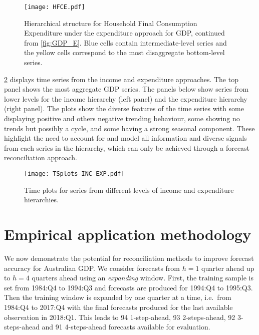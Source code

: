 {\begin{figure}[!t]
	\centering
	\texttt{[image: HFCE.pdf]}
	\caption{Hierarchical structure for Household Final Consumption Expenditure under the expenditure approach for GDP, continued from \ref{fig:GDP_E}. Blue cells contain intermediate-level series and the yellow cells correspond to the most disaggregate bottom-level series.}\label{fig:HFCE}
\end{figure}

\ref{fig:TSplots-INC-EXP} displays time series from the income and expenditure approaches. The top panel shows the most aggregate GDP series. The panels below show series from lower levels for the income hierarchy (left panel) and the expenditure hierarchy (right panel). The plots show the diverse features of the time series with some displaying positive and others negative trending behaviour, some showing no trends but possibly a cycle, and some having a strong seasonal component. These highlight the need to account for and model all information and diverse signals from each series in the hierarchy, which can only be achieved through a forecast reconciliation approach.

\begin{figure}
	\centering
	\small
	\texttt{[image: TSplots-INC-EXP.pdf]}
	\caption{Time plots for series from different levels of income and expenditure hierarchies.}\label{fig:TSplots-INC-EXP}
\end{figure}

\section{Empirical application methodology}\label{sec:meth}

We now demonstrate the potential for reconciliation methods to improve forecast accuracy for Australian GDP\@. We consider forecasts from $h=1$ quarter ahead up to $h=4$ quarters ahead using an \emph{expanding} window. First, the training sample is set from 1984:Q4 to 1994:Q3 and forecasts are produced for 1994:Q4 to 1995:Q3. Then the training window is expanded by one quarter at a time, i.e.\ from 1984:Q4 to 2017:Q4 with the final forecasts produced for the last available observation in 2018:Q1. This leads to 94 1-step-ahead, 93 2-steps-ahead, 92 3-steps-ahead and 91 4-steps-ahead forecasts available for evaluation.

}

